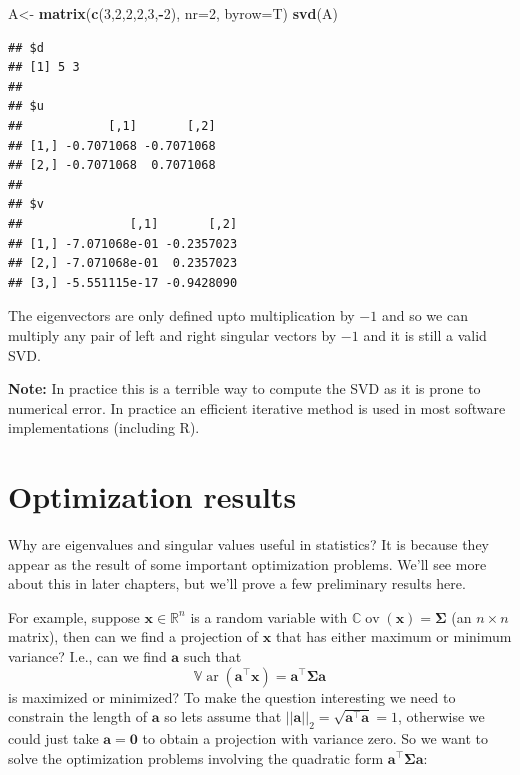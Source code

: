 \documentclass[]{book}
\newenvironment{Shaded}{\begin{snugshade}}{\end{snugshade}}
\newcommand{\DataTypeTok}[1]{\textcolor[rgb]{0.13,0.29,0.53}{#1}}
\newcommand{\DecValTok}[1]{\textcolor[rgb]{0.00,0.00,0.81}{#1}}
\newcommand{\KeywordTok}[1]{\textcolor[rgb]{0.13,0.29,0.53}{\textbf{#1}}}
\newcommand{\NormalTok}[1]{#1}
\newcommand{\OperatorTok}[1]{\textcolor[rgb]{0.81,0.36,0.00}{\textbf{#1}}}
\newcommand{\StringTok}[1]{\textcolor[rgb]{0.31,0.60,0.02}{#1}}
\theoremstyle{definition}
\theoremstyle{definition}
\theoremstyle{definition}
\theoremstyle{remark}
\begin{document}
\begin{Shaded}
\begin{Highlighting}[]
\NormalTok{A<-}\StringTok{ }\KeywordTok{matrix}\NormalTok{(}\KeywordTok{c}\NormalTok{(}\DecValTok{3}\NormalTok{,}\DecValTok{2}\NormalTok{,}\DecValTok{2}\NormalTok{,}\DecValTok{2}\NormalTok{,}\DecValTok{3}\NormalTok{,}\OperatorTok{-}\DecValTok{2}\NormalTok{), }\DataTypeTok{nr=}\DecValTok{2}\NormalTok{, }\DataTypeTok{byrow=}\NormalTok{T)}
\KeywordTok{svd}\NormalTok{(A)}
\end{Highlighting}
\end{Shaded}

\begin{verbatim}
## $d
## [1] 5 3
## 
## $u
##            [,1]       [,2]
## [1,] -0.7071068 -0.7071068
## [2,] -0.7071068  0.7071068
## 
## $v
##               [,1]       [,2]
## [1,] -7.071068e-01 -0.2357023
## [2,] -7.071068e-01  0.2357023
## [3,] -5.551115e-17 -0.9428090
\end{verbatim}

The eigenvectors are only defined upto multiplication by \(-1\) and so we can multiply any pair of left and right singular vectors by \(-1\) and it is still a valid SVD.

\textbf{Note:} In practice this is a terrible way to compute the SVD as it is prone to numerical error. In practice an efficient iterative method is used in most software implementations (including R).

\hypertarget{optimization-results}{%
\section{Optimization results}\label{optimization-results}}

Why are eigenvalues and singular values useful in statistics? It is because they appear as the result of some important optimization problems. We'll see more about this in later chapters, but we'll prove a few preliminary results here.

For example, suppose \(\boldsymbol x\in\mathbb{R}^n\) is a random variable with \({\mathbb{C}\operatorname{ov}}(\boldsymbol x)=\boldsymbol \Sigma\) (an \(n \times n\) matrix), then can we find a projection of \(\boldsymbol x\) that has either maximum or minimum variance? I.e., can we find \(\boldsymbol a\) such that \[{\mathbb{V}\operatorname{ar}}(\boldsymbol a^\top\boldsymbol x)=\boldsymbol a^\top \boldsymbol \Sigma\boldsymbol a\] is maximized or minimized?
To make the question interesting we need to constrain the length of \(\boldsymbol a\) so lets assume that \(||\boldsymbol a||_2 = \sqrt{\boldsymbol a^\top \boldsymbol a}=1\), otherwise we could just take \(\boldsymbol a=\boldsymbol 0\) to obtain a projection with variance zero. So we want to solve the optimization problems involving the quadratic form \(\boldsymbol a^\top \boldsymbol \Sigma\boldsymbol a\):
\end{document}
